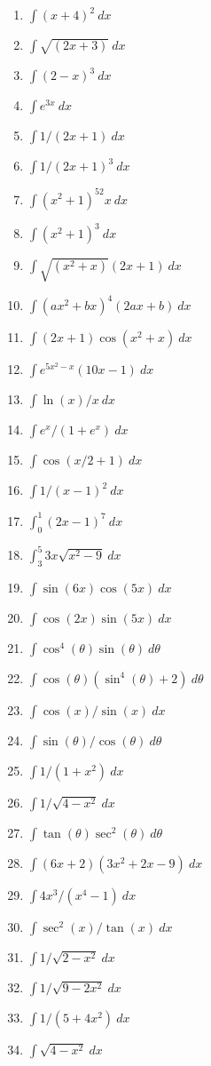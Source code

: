 \documentclass[
  11pt,
  oneside]{book}
\providecommand{\tightlist}{%
  \setlength{\itemsep}{0pt}\setlength{\parskip}{0pt}}
\theoremstyle{definition}
\theoremstyle{definition}
\theoremstyle{definition}
\theoremstyle{definition}
\theoremstyle{remark}
\begin{document}
\begin{enumerate}
\def\labelenumi{\arabic{enumi}.}
\tightlist
\item
  \(\int (x+4)^2\ dx\)
\item
  \(\int \sqrt{(2x+3)}\ dx\)
\item
  \(\int (2-x)^3\ dx\)
\item
  \(\int e^{3x}\ dx\)
\item
  \(\int 1/(2x+1)\ dx\)
\item
  \(\int 1/(2x+1)^3\ dx\)
\item
  \(\int (x^2+1)^52x \ dx\)
\item
  \(\int (x^2+1)^3\ dx\)
\item
  \(\int \sqrt{(x^2+x)}(2x+1) \ dx\)
\item
  \(\int (ax^2+bx)^4(2ax+b)\ dx\)
\item
  \(\int (2x+1)\cos(x^2+x) \ dx\)
\item
  \(\int e^{5x^2-x}(10x-1)\ dx\)
\item
  \(\int \ln(x)/x \ dx\)
\item
  \(\int e^x/(1+e^x)\ dx\)
\item
  \(\int \cos(x/2+1)\ dx\)
\item
  \(\int 1/(x-1)^2\ dx\)
\item
  \(\int_0^1 (2x-1)^7\ dx\)
\item
  \(\int_3^5 3x\sqrt{x^2-9}\ dx\)
\item
  \(\int\sin(6x)\cos(5x) \ dx\)
\item
  \(\int \cos(2x)\sin(5x)\ dx\)
\item
  \(\int \cos^4(\theta)\sin(\theta)\ d\theta\)
\item
  \(\int \cos(\theta)(\sin^4(\theta)+2)\ d\theta\)
\item
  \(\int \cos(x)/\sin(x)\ dx\)
\item
  \(\int \sin(\theta)/\cos(\theta)\ d\theta\)
\item
  \(\int 1/(1+x^2)\ dx\)
\item
  \(\int 1/\sqrt{4-x^2}\ dx\)
\item
  \(\int \tan(\theta)\sec^2(\theta)\ d\theta\)
\item
  \(\int (6x+2)(3x^2+2x-9)\ dx\)
\item
  \(\int 4x^3/(x^4-1)\ dx\)
\item
  \(\int \sec^2(x)/\tan(x)\ dx\)
\item
  \(\int 1/\sqrt{2-x^2}\ dx\)
\item
  \(\int 1/\sqrt{9-2x^2}\ dx\)
\item
  \(\int 1/(5+4x^2)\ dx\)
\item
  \(\int \sqrt{4-x^2}\ dx\)
\end{enumerate}
\end{document}
